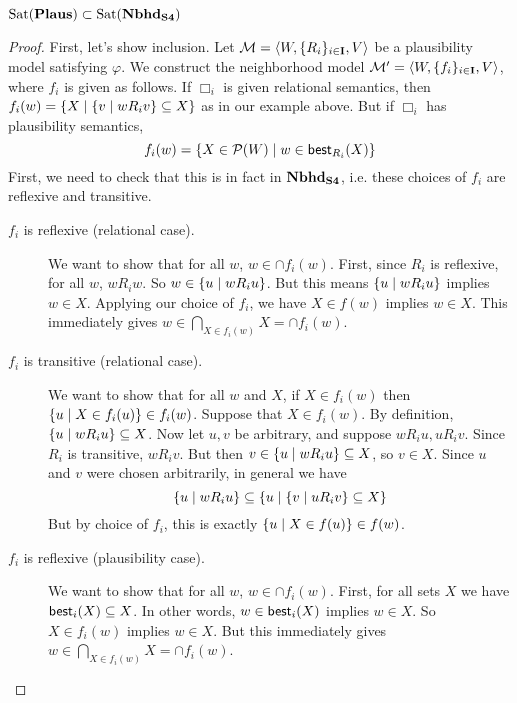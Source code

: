 \documentclass[letterpaper]{article}
\begin{document}

\begin{proposition}
    $\mathrm{Sat}( \textrm{\textbf{Plaus}} ) \subset \mathrm{Sat}( \textrm{\textbf{Nbhd}}_\textrm{\textbf{S4}} )$
\end{proposition}
\begin{proof}
    First, let's show inclusion.  Let $\mathcal{M} = \langle W, \{ R_i \}_{i \in \textbf{I}}, V \rangle$ be a plausibility model satisfying $\varphi$.  We construct the neighborhood model $\mathcal{M}' = \langle W, \{ f_i \}_{i \in \textbf{I}}, V \rangle$, where $f_i$ is given as follows.  If $\Box_i$ is given relational semantics, then $f_i(w) = \{ X \mid \{ v \mid w{R_i}v  \}\subseteq X \}$ as in our example above.  But if $\Box_i$ has plausibility semantics,
    \[
        f_i(w) = \{ X \in \mathcal{P}(W) \mid w \in \mathsf{best}_{R_i}(X) \}
    \]
    First, we need to check that this is in fact in $\textrm{\textbf{Nbhd}}_\textrm{\textbf{S4}}$, i.e. these choices of $f_i$ are reflexive and transitive.
    \begin{description}
        \item[$f_i$ is reflexive (relational case).]
        We want to show that for all $w$, $w \in \cap f_i(w)$.  First, since $R_i$ is reflexive, for all $w$, $w{R_i}w$.  So $w \in \{ u \mid w{R_i}u \}$.  But this means $\{ u \mid w{R_i}u \}$ implies $w \in X$.  Applying our choice of $f_i$, we have $X \in f(w)$ implies $w \in X$.  This immediately gives $w \in \bigcap_{X \in f_i(w)} X = \cap f_i(w)$.

        \item[$f_i$ is transitive (relational case).]
        We want to show that for all $w$ and $X$, if $X \in f_i(w)$ then $\{ u \mid X \in f_i(u) \} \in f_i(w)$.  Suppose that $X \in f_i(w)$.  By definition, $\{ u \mid w{R_i}u \} \subseteq X$.  Now let $u, v$ be arbitrary, and suppose $w{R_i}u, u{R_i}v$.  Since $R_i$ is transitive, $w{R_i}v$.  But then $v \in \{ u \mid w{R_i}u \} \subseteq X$, so $v \in X$.  Since $u$ and $v$ were chosen arbitrarily, in general we have
        \[
            \{ u \mid w{R_i}u \} \subseteq \{ u \mid \{ v \mid u{R_i}v \} \subseteq X \}
        \]
        But by choice of $f_i$, this is exactly $\{ u \mid X \in f(u) \} \in f(w)$.

        \item[$f_i$ is reflexive (plausibility case).]
        We want to show that for all $w$, $w \in \cap f_i(w)$.  First, for all sets $X$ we have $\mathsf{best}_i(X) \subseteq X$.  In other words, $w \in \mathsf{best}_i(X)$ implies $w \in X$.  So $X \in f_i(w)$ implies $w \in X$.  But this immediately gives $w \in \bigcap_{X \in f_i(w)} X = \cap f_i(w)$.


\end{description}
\end{proof}
\end{document}

